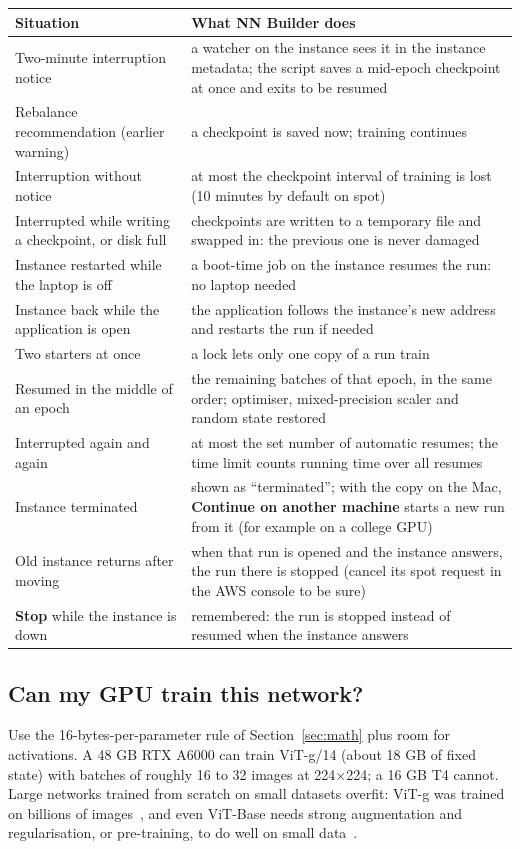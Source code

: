 \documentclass[11pt,a4paper]{article}
\newcommand{\ui}[1]{\textbf{\textsf{#1}}}
\begin{document}
\begin{longtable}{@{}p{5cm}p{10cm}@{}}
\toprule
\textbf{Situation} & \textbf{What NN Builder does}\\
\midrule\endhead
Two-minute interruption notice & a watcher on the instance sees it in the instance metadata; the script saves a mid-epoch checkpoint at once and exits to be resumed\\
Rebalance recommendation (earlier warning) & a checkpoint is saved now; training continues\\
Interruption without notice & at most the checkpoint interval of training is lost (10 minutes by default on spot)\\
Interrupted while writing a checkpoint, or disk full & checkpoints are written to a temporary file and swapped in: the previous one is never damaged\\
Instance restarted while the laptop is off & a boot-time job on the instance resumes the run: no laptop needed\\
Instance back while the application is open & the application follows the instance's new address and restarts the run if needed\\
Two starters at once & a lock lets only one copy of a run train\\
Resumed in the middle of an epoch & the remaining batches of that epoch, in the same order; optimiser, mixed-precision scaler and random state restored\\
Interrupted again and again & at most the set number of automatic resumes; the time limit counts running time over all resumes\\
Instance terminated & shown as ``terminated''; with the copy on the Mac, \ui{Continue on another machine} starts a new run from it (for example on a college GPU)\\
Old instance returns after moving & when that run is opened and the instance answers, the run there is stopped (cancel its spot request in the AWS console to be sure)\\
\ui{Stop} while the instance is down & remembered: the run is stopped instead of resumed when the instance answers\\
\bottomrule
\end{longtable}

\subsection{Can my GPU train this network?}
Use the 16-bytes-per-parameter rule of Section~\ref{sec:math} plus room for activations. A 48 GB RTX A6000 can train ViT-g/14
(about 18 GB of fixed state) with batches of roughly 16 to 32 images at 224$\times$224; a 16 GB T4 cannot. Large networks trained from
scratch on small datasets overfit: ViT-g was trained on billions of images~\cite{zhai2021scaling}, and even ViT-Base needs strong
augmentation and regularisation, or pre-training, to do well on small data~\cite{steiner2021howtotrain,touvron2020deit}.
\end{document}
